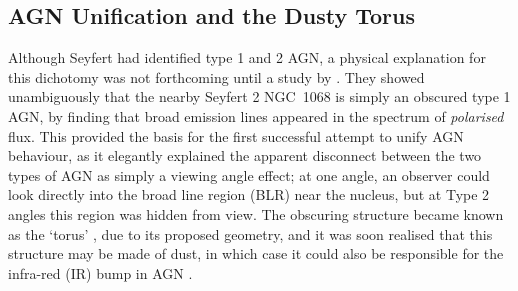 




\subsection{AGN Unification and the Dusty Torus}
\label{agn_unification}

Although Seyfert had identified type 1 and 2 AGN, a physical explanation
for this dichotomy was not forthcoming until a study by \citet[][AM85]{antonucci1985}.
They showed unambiguously that the nearby Seyfert 2 NGC~1068 is simply an obscured
type 1 AGN, by finding that broad emission lines appeared in the spectrum of
{\em polarised} flux. This provided the basis for the first successful attempt
to unify AGN behaviour, as it elegantly 
explained the apparent disconnect between the two types of 
AGN as simply a viewing angle effect; at one angle, an observer could look directly
into the broad line region (BLR) near the nucleus, but at Type 2 angles
this region was hidden from view.
The obscuring structure became known as the `torus' \citep{krolik1986}, 
due to its proposed geometry, and it was soon realised that this structure
may be made of dust, in which case it could also be responsible for the infra-red (IR)
bump in AGN \citep{neugebauer1979}.

